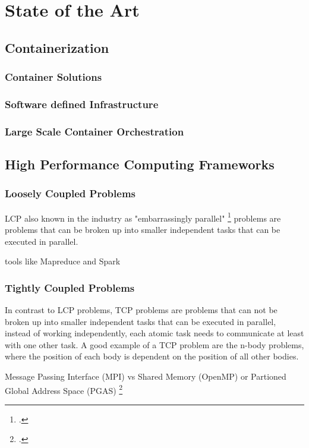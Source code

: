 \chapter{State of the Art}
\label{State_of_the_Art}

\section{Containerization}


    \subsection*{Container Solutions}
    \subsection*{Software defined Infrastructure}
    \subsection*{Large Scale Container Orchestration}
    

\section{High Performance Computing Frameworks}


\subsection{Loosely Coupled Problems}

\ac{LCP} also known in the industry as "embarrassingly parallel" \footcite{smtn} problems are problems that can be broken up into smaller independent tasks that can be executed in parallel.


tools like Mapreduce and Spark



\subsection{Tightly Coupled Problems}
\label{state_of_the_art_tcp}
In contrast to \ac{LCP} problems, \ac{TCP} problems are problems that can not be broken up into smaller independent tasks that can be executed in parallel,
instead of working independently, each atomic task needs to communicate at least with one other task.
A good example of a \ac{TCP} problem are the n-body problems, where the position of each body is dependent on the position of all other bodies.

Message Passing Interface (MPI) vs Shared Memory (OpenMP) or Partioned Global Address Space (PGAS) \footcite{smtn}  